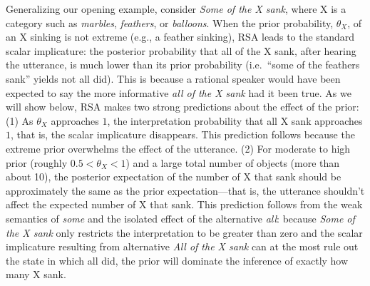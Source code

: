 \documentclass[10pt,letterpaper]{article}
\begin{document}
Generalizing our opening example, consider \emph{Some of the X sank}, where X is a category such as \emph{marbles}, \emph{feathers}, or \emph{balloons}. When the prior probability, $\theta_{X}$, of an X sinking is not extreme (e.g., a feather sinking), RSA leads to the standard scalar implicature: the posterior probability that all of the X sank, after hearing the utterance, is much lower than its prior probability (i.e.~``some of the feathers sank'' yields not all did). This is because a rational speaker would have been expected to say the more informative \emph{all of the X sank} had it been true.
As we will show below, RSA makes two strong predictions about the effect of the prior: (1) As $\theta_{X}$ approaches $1$, the interpretation probability that all X sank approaches $1$, that is, the scalar implicature disappears. 
This prediction follows because the extreme prior overwhelms the effect of the utterance.
(2) For moderate to high prior (roughly $0.5{<}\theta_{X}{<}1$) and a large total number of objects (more than about 10), the posterior expectation of the number of X that sank should be approximately the same as the prior expectation---that is, the utterance shouldn't affect the expected number of X that sank. 
This prediction follows from the weak semantics of \emph{some} and the isolated effect of the alternative \emph{all}: because \emph{Some of the X sank} only restricts the interpretation to be greater than zero and the scalar implicature resulting from alternative \emph{All of the X sank} can at the most rule out the state in which all did, the prior will dominate the inference of exactly how many X sank.
\end{document}
